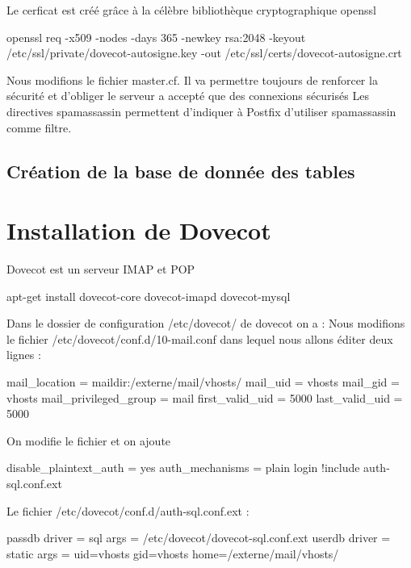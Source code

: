 \documentclass[a4paper,12pt,french]{report} %
\begin{document}
Le cerficat est créé grâce à la célèbre bibliothèque  cryptographique openssl
\begin{exempleConsole}
openssl req -x509 -nodes -days 365 -newkey rsa:2048 -keyout /etc/ssl/private/dovecot-autosigne.key -out /etc/ssl/certs/dovecot-autosigne.crt
\end{exempleConsole}
Nous modifions le fichier master.cf. Il va permettre toujours de renforcer la sécurité et d'obliger le serveur a accepté que des connexions sécurisés
Les directives spamassassin permettent d'indiquer à Postfix d'utiliser spamassassin comme filtre.
\subsection{Création de la base de donnée des tables}
\section{Installation de Dovecot}
Dovecot est un serveur IMAP et POP 
\begin{exempleConsole}
apt-get install dovecot-core dovecot-imapd dovecot-mysql
\end{exempleConsole}
Dans le dossier de configuration /etc/dovecot/ de dovecot on a :
Nous modifions le fichier /etc/dovecot/conf.d/10-mail.conf dans lequel nous allons éditer deux lignes :
\begin{exempleConsole}
mail_location = maildir:/externe/mail/vhosts/%
mail_uid = vhosts
mail_gid = vhosts
mail_privileged_group = mail
first_valid_uid = 5000
last_valid_uid = 5000
\end{exempleConsole}
On modifie le fichier et on ajoute 
\begin{exempleConsole}
disable_plaintext_auth = yes
auth_mechanisms = plain login
!include auth-sql.conf.ext
\end{exempleConsole}
Le fichier /etc/dovecot/conf.d/auth-sql.conf.ext :
\begin{exempleConsole}
passdb {
  driver = sql
  args = /etc/dovecot/dovecot-sql.conf.ext
}
userdb {
  driver = static
  args = uid=vhosts gid=vhosts home=/externe/mail/vhosts/%
}
\end{exempleConsole}
\end{document}
